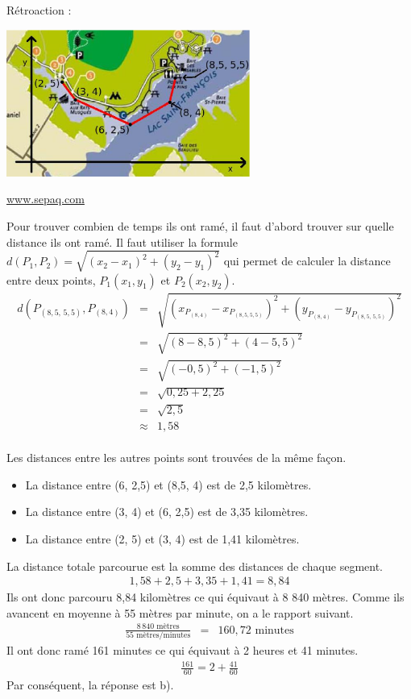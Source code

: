 \documentclass[letterpaper, 12pt]{article}
\begin{document}
R\'etroaction :\\
\begin{center}
 \includegraphics[width=8cm,bb=14 14 604 370]{Q2485.eps}
\end{center}
\begin{center}
 \underline{www.sepaq.com}
\end{center}
Pour trouver combien de temps ils ont ram\'e, il faut d'abord trouver sur quelle distance ils ont ram\'e. Il faut utiliser la formule $d(P_{1}, P_{2})=\sqrt{(x_{2}-x_{1})^{2}+(y_{2}-y_{1})^{2}}$ qui permet de calculer la distance entre deux points, $P_{1}(x_{1}, y_{1})$ et $P_{2}(x_{2}, y_{2})$.
\begin{eqnarray*}
 d(P_{(8,5,\, 5,5)}, P_{(8, 4)})&=&\sqrt{(x_{P_{(8, 4)}}-x_{P_{(8,5, 5,5)}})^{2}+(y_{P_{(8, 4)}}-y_{P_{(8,5,\, 5,5)}})^{2}}\\
&=&\sqrt{(8-8,5)^{2}+(4-5,5)^{2}}\\
&=&\sqrt{(-0,5)^{2}+(-1,5)^{2}}\\
&=&\sqrt{0,25+2,25}\\
&=&\sqrt{2,5}\\
&\approx&1,58
\end{eqnarray*}\\
Les distances entre les autres points sont trouv\'ees de la m\^eme fa\c con.
\begin{itemize}
 \item La distance entre (6, 2,5) et (8,5, 4) est de 2,5 kilom\`etres.
\item La distance entre (3, 4) et (6, 2,5) est de 3,35 kilom\`etres.
\item La distance entre (2, 5) et (3, 4) est de 1,41 kilom\`etres.\\
\end{itemize}
La distance totale parcourue est la somme des distances de chaque segment.
\begin{eqnarray*}
 1,58+2,5+3,35+1,41=8,84
\end{eqnarray*}
Ils ont donc parcouru 8,84 kilom\`etres ce qui \'equivaut \`a 8 840 m\`etres. Comme ils avancent en moyenne \`a 55 m\`etres par minute, on a le rapport suivant.
\begin{eqnarray*}
 \frac{8\,840 \textrm{ m\`etres}}{55\textrm{ m\`etres/minutes}}&=& 160,72 \textrm{ minutes}
\end{eqnarray*}
Il ont donc ram\'e 161 minutes ce qui \'equivaut \`a 2 heures et 41 minutes.
\begin{eqnarray*}
 \frac{161}{60}=2+\frac{41}{60}
\end{eqnarray*}
Par cons\'equent, la r\'eponse est b).\\
\end{document}
